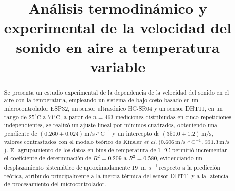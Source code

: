 \documentclass[conference]{IEEEtran}
\begin{document}
\title{Análisis termodinámico y experimental de la velocidad del sonido en aire a temperatura variable}

\author{
}

\maketitle

\begin{abstract}
Se presenta un estudio experimental de la dependencia de la velocidad del sonido en el aire con la temperatura, empleando un sistema de bajo costo basado en un microcontrolador ESP32, un sensor ultrasónico HC-SR04 y un sensor DHT11, en un rango de $25^{\circ}\text{C}$ a $71^{\circ}\text{C}$, a partir de $n=463$ mediciones distribuidas en cinco repeticiones independientes, se realizó un ajuste lineal por mínimos cuadrados, obteniendo una pendiente de $(0.260 \pm 0.024)\,\text{m/s}\cdot^{\circ}\text{C}^{-1}$ y un intercepto de $(350.0 \pm 1.2)\,\text{m/s}$, valores contrastados con el modelo teórico de Kinsler \textit{et al.} ($0.606\,\text{m/s}\cdot^{\circ}\text{C}^{-1}$, $331.3\,\text{m/s}$). 
El agrupamiento de los datos en bins de temperatura de \SI{1}{\celsius} permitió incrementar el coeficiente de determinación de $R^2=0.209$ a $R^2=0.580$, evidenciando un desplazamiento sistemático de aproximadamente \SI{19}{\meter\per\second} respecto a la predicción teórica, atribuido principalmente a la inercia térmica del sensor DHT11 y a la latencia de procesamiento del microcontrolador.
\end{abstract}

\end{document}
